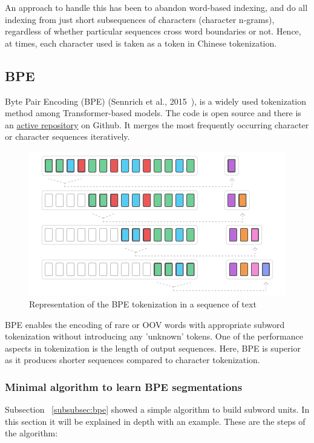 An approach to handle this has been to abandon word-based indexing, and do all indexing from just short subsequences of characters (character n-grams), regardless of whether particular sequences cross word boundaries or not. Hence, at times, each character used is taken as a token in Chinese tokenization.

\subsection{BPE}

Byte Pair Encoding (BPE) (Sennrich et al., 2015~\cite{sennrich2015neural}), is a widely used tokenization method among Transformer-based models. The code is open source and there is an \href{https://github.com/rsennrich/subword-nmt}{active repository} on Github. It merges the most frequently occurring character or character sequences iteratively.

\begin{figure}[!ht]
    \centering
    \includegraphics[width=14cm]{figures/bpe.png}
    \caption{Representation of the BPE tokenization in a sequence of text}
\end{figure}

BPE enables the encoding of rare or OOV words with appropriate subword tokenization without introducing any 'unknown' tokens. One of the performance aspects in tokenization is the length of output sequences. Here, BPE is superior as it produces shorter sequences compared to character tokenization.

\subsubsection{Minimal algorithm to learn BPE segmentations}

Subsection ~\ref{subsubsec:bpe} showed a simple algorithm to build subword units. In this section it will be explained in depth with an example. These are the steps of the algorithm:

